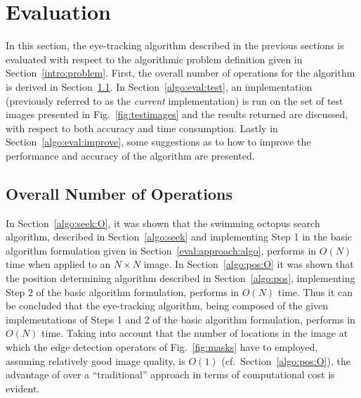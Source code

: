 
\section{Evaluation}
\label{algo:eval}

In this section, the {\octopus} eye-tracking algorithm described in
the previous sections is evaluated with respect to the algorithmic
problem definition given in Section~\ref{intro:problem}.  First, the
overall number of operations for the algorithm is derived in
Section~\ref{algo:eval:O}.  In Section~\ref{algo:eval:test}, an
implementation (previously referred to as the {\em current\/}
implementation) is run on the set of test images presented in
Fig.~\ref{fig:testimages} and the results returned are discussed, with
respect to both accuracy and time consumption.  Lastly in
Section~\ref{algo:eval:improve}, some suggestions as to how to improve
the performance and accuracy of the algorithm are presented.

\subsection{Overall Number of Operations}
\label{algo:eval:O}

In Section~\ref{algo:seek:O}, it was shown that the swimming octopus
search algorithm, described in Section~\ref{algo:seek} and
implementing Step 1 in the basic algorithm formulation given in
Section~\ref{eval:approach:algo}, performs in $O(N)$ time when applied
to an $N\times N$ image.  In Section~\ref{algo:pos:O} it was shown
that the position determining algorithm described in
Section~\ref{algo:pos}, implementing Step 2 of the basic algorithm
formulation, performs in $O(N)$ time.  Thus it can be concluded that
the {\octopus} eye-tracking algorithm, being composed of the given
implementations of Steps 1 and 2 of the basic algorithm formulation,
performs in $O(N)$ time.  Taking into account that the number of
locations in the image at which the edge detection operators of
Fig.~\ref{fig:masks} have to employed, assuming relatively good image
quality, is $O(1)$ (cf.\ Section~\ref{algo:pos:O}), the advantage of
{\octopus} over a ``traditional'' approach in terms of computational
cost is evident.

